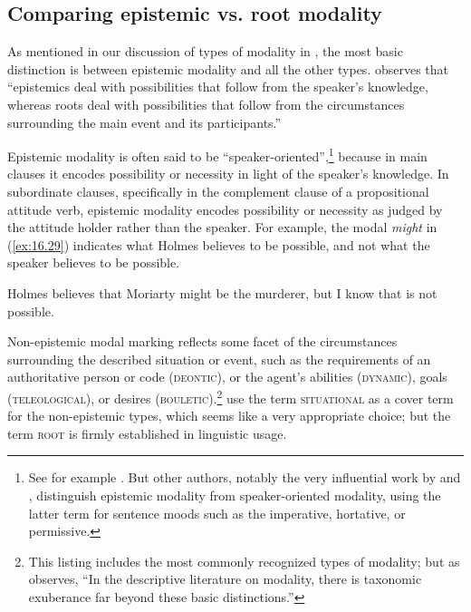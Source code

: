 \subsection{Comparing epistemic vs. root modality}\label{sec:16.5.1}

As mentioned in our discussion of types of modality in , the most basic distinction is between epistemic modality and all the other types. \citet[1486]{Hacquard2011} observes that “epistemics deal with possibilities that follow from the speaker’s knowledge, whereas roots deal with possibilities that follow from the circumstances surrounding the main event and its participants.”



Epistemic modality is often said to be “speaker-oriented”,\footnote{See for example \citet{Hacquard2007}. But other authors, notably the very influential work by \citet{Bybee1985} and \citet{BybeeEtAl1994}, distinguish epistemic modality from speaker-oriented modality, using the latter term for sentence moods such as the imperative, hortative, or permissive.} because in main clauses it encodes possibility or necessity in light of the speaker’s knowledge. In subordinate clauses, specifically in the complement clause of a propositional attitude verb, epistemic modality encodes possibility or necessity as judged by the attitude holder rather than the speaker. For example, the modal \textit{might} in (\ref{ex:16.29}) indicates what Holmes believes to be possible, and not what the speaker believes to be possible.


\ea \label{ex:16.29}
Holmes believes that Moriarty might be the murderer, but I know that is not possible.\\
\z


Non-epistemic modal marking reflects some facet of the circumstances surrounding the described situation or event, such as the requirements of an authoritative person or code (\textsc{deontic}), or the agent’s abilities (\textsc{dynamic}), goals (\textsc{teleological}), or desires (\textsc{bouletic}).\footnote{This listing includes the most commonly recognized types of modality; but as \citet{vonFintel2006} observes, “In the descriptive literature on modality, there is taxonomic exuberance far beyond these basic distinctions.”}   use the term \textsc{situational} as a cover term for the non-epistemic types, which seems like a very appropriate choice; but the term \textsc{root} is firmly established in linguistic usage.



